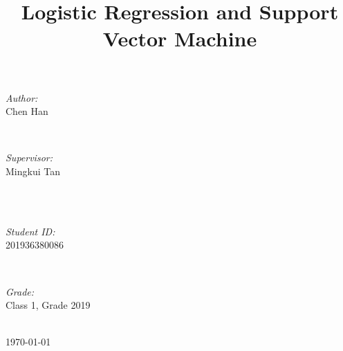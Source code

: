 \documentclass[journal, a4paper]{IEEEtran}
\begin{document}
\begin{titlepage}
\begin{minipage}{0.4\textwidth}
\begin{flushleft} \large
\emph{Author:}\\
 Chen Han %
\end{flushleft}
\end{minipage}
~
\begin{minipage}{0.4\textwidth}
\begin{flushright} \large
\emph{Supervisor:} \\
Mingkui Tan%
\end{flushright}
\end{minipage}\\[2cm]
~
\begin{minipage}{0.4\textwidth}
\begin{flushleft} \large
\emph{Student ID:}\\
201936380086
\end{flushleft}
\end{minipage}
~
\begin{minipage}{0.4\textwidth}
\begin{flushright} \large
\emph{Grade:} \\
Class 1, Grade 2019
\end{flushright}
\end{minipage}\\[2cm]



{\large \today}\\[2cm] %

 

\vfill %

\end{titlepage}

	\title{Logistic Regression and Support Vector Machine}
	\maketitle
\end{document}
